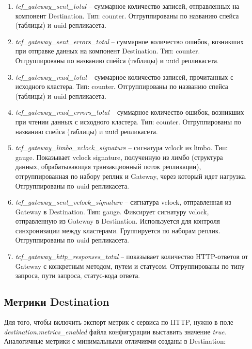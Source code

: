 \begin{enumerate}[label=\arabic*.]
  \item \textit{tcf\_gateway\_sent\_total} -- суммарное количество записей, отправленных на компонент
  Destination. Тип: counter. Отгруппированы по названию спейса (таблицы) и uuid репликасета.
  \item \textit{tcf\_gateway\_sent\_errors\_total} -- суммарное количество ошибок, возникших при отправке
  данных на компонент Destination. Тип: counter. Отгруппированы по названию спейса (таблицы) и uuid репликасета.
  \item \textit{tcf\_gateway\_read\_total} -- суммарное количество записей, прочитанных с исходного
  кластера. Тип: counter. Отгруппированы по названию спейса (таблицы) и uuid репликасета.
  \item \textit{tcf\_gateway\_read\_errors\_total} -- суммарное количество ошибок, возникших при чтении
  данных с исходного кластера. Тип: counter. Отгруппированы по названию спейса (таблицы) и uuid репликасета.
  \item \textit{tcf\_gateway\_limbo\_vclock\_signature} -- сигнатура vclock из limbo. Тип: gauge.
  Показывает vclock signature, полученную из лимбо (структура данных, обрабатывающая транзакционный
  поток репликации), отгруппированная по набору реплик и Gateway, через который идет нагрузка.
  Отгруппированы по uuid репликасета.
  \item \textit{tcf\_gateway\_sent\_vclock\_signature} -- сигнатура vclock, отправленная из Gateway в
  Destination. Тип: gauge. Фиксирует сигнатуру vclock, отправленную из Gateway в Destination.
  Используется для контроля синхронизации между кластерами. Группируется по наборам реплик.
  Отгруппированы по uuid репликасета.
  \item \textit{tcf\_gateway\_http\_responses\_total} -- показывает количество HTTP-ответов от Gateway с
  конкретным методом, путем и статусом. Отгруппированы по типу запроса, пути запроса, статус-кода ответа.
\end{enumerate}

\subsection{Метрики Destination}

Для того, чтобы включить экспорт метрик с сервиса по HTTP, нужно в поле \textit{destination.metrics\_enabled}
файла конфигурации выставить значение \textit{true}. Аналогичные метрики с минимальными отличиями созданы в Destination:

